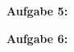 \documentclass[a4paper]{scrartcl}
\begin{document}
	\begin{flushleft}
		\textbf{Aufgabe 5:}\\		
	\end{flushleft}
	\begin{flushleft}
		\textbf{Aufgabe 6:}\\		
	\end{flushleft}
\end{document}
